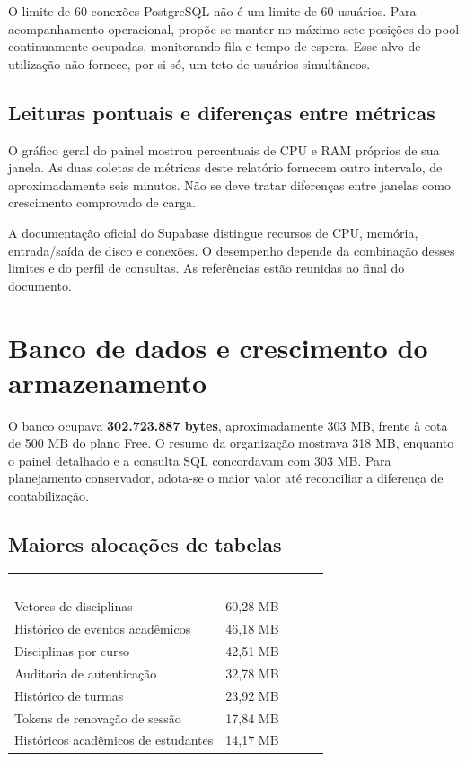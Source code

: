 \documentclass[10pt,a4paper]{article}
\newcommand{\code}[1]{{\ttfamily\footnotesize\detokenize{#1}}}
\newcommand{\headcell}[1]{\textcolor{white}{\bfseries #1}}
\newcommand{\pagechapter}[1]{\clearpage\section{#1}}
\begin{document}
O limite de 60 conexões PostgreSQL não é um limite de 60 usuários. Para acompanhamento operacional, propõe-se manter no máximo sete posições do pool continuamente ocupadas, monitorando fila e tempo de espera. Esse alvo de utilização não fornece, por si só, um teto de usuários simultâneos.

\subsection{Leituras pontuais e diferenças entre métricas}
O gráfico geral do painel mostrou percentuais de CPU e RAM próprios de sua janela. As duas coletas de métricas deste relatório fornecem outro intervalo, de aproximadamente seis minutos. Não se deve tratar diferenças entre janelas como crescimento comprovado de carga.

A documentação oficial do Supabase distingue recursos de CPU, memória, entrada/saída de disco e conexões. O desempenho depende da combinação desses limites e do perfil de consultas. As referências estão reunidas ao final do documento.

\pagechapter{Banco de dados e crescimento do armazenamento}
O banco \code{postgres} ocupava \textbf{302.723.887 bytes}, aproximadamente 303 MB, frente à cota de 500 MB do plano Free. O resumo da organização mostrava 318 MB, enquanto o painel detalhado e a consulta SQL concordavam com 303 MB. Para planejamento conservador, adota-se o maior valor até reconciliar a diferença de contabilização.

\subsection{Maiores alocações de tabelas}
\begingroup\small\renewcommand{\arraystretch}{1.28}
\par\noindent\begin{tabularx}{\linewidth}{@{}Y R{33mm}@{}}
\headcell{Dados armazenados}&\headcell{Alocação total}\\
Vetores de disciplinas&60,28 MB\\
Histórico de eventos acadêmicos&46,18 MB\\
Disciplinas por curso&42,51 MB\\
Auditoria de autenticação&32,78 MB\\
Histórico de turmas&23,92 MB\\
Tokens de renovação de sessão&17,84 MB\\
Históricos acadêmicos de estudantes&14,17 MB\\
\end{tabularx}\endgroup
\end{document}
